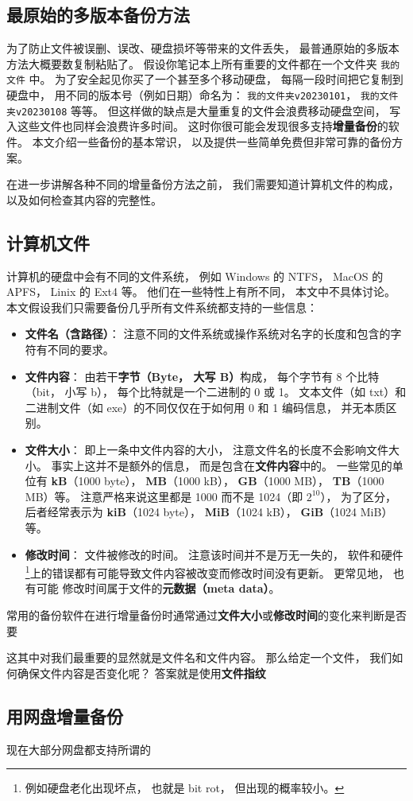 
\subsection{最原始的多版本备份方法}
为了防止文件被误删、误改、硬盘损坏等带来的文件丢失， 最普通原始的多版本方法大概要数复制粘贴了。 假设你笔记本上所有重要的文件都在一个文件夹 \verb|我的文件| 中。 为了安全起见你买了一个甚至多个移动硬盘， 每隔一段时间把它复制到硬盘中， 用不同的版本号（例如日期）命名为： \verb|我的文件夹v20230101|， \verb|我的文件夹v20230108| 等等。 但这样做的缺点是大量重复的文件会浪费移动硬盘空间， 写入这些文件也同样会浪费许多时间。 这时你很可能会发现很多支持\textbf{增量备份}的软件。 本文介绍一些备份的基本常识， 以及提供一些简单免费但非常可靠的备份方案。

在进一步讲解各种不同的增量备份方法之前， 我们需要知道计算机文件的构成， 以及如何检查其内容的完整性。

\subsection{计算机文件}
计算机的硬盘中会有不同的文件系统， 例如 Windows 的 NTFS， MacOS 的 APFS， Linix 的 Ext4 等。 他们在一些特性上有所不同， 本文中不具体讨论。 本文假设我们只需要备份几乎所有文件系统都支持的一些信息：
\begin{itemize}
\item \textbf{文件名（含路径）}： 注意不同的文件系统或操作系统对名字的长度和包含的字符有不同的要求。
\item \textbf{文件内容}： 由若干\textbf{字节（Byte， 大写 B）}构成， 每个字节有 8 个比特（bit， 小写 b）， 每个比特就是一个二进制的 0 或 1。 文本文件（如 txt）和二进制文件（如 exe）的不同仅仅在于如何用 0 和 1 编码信息， 并无本质区别。
\item \textbf{文件大小}： 即上一条中文件内容的大小， 注意文件名的长度不会影响文件大小。 事实上这并不是额外的信息， 而是包含在\textbf{文件内容}中的。 一些常见的单位有 \textbf{kB}（1000 byte）， \textbf{MB}（1000 kB）， \textbf{GB}（1000 MB）， \textbf{TB}（1000 MB）等。 注意严格来说这里都是 1000 而不是 1024（即 $2^{10}$）， 为了区分， 后者经常表示为 \textbf{kiB}（1024 byte）， \textbf{MiB}（1024 kB）， \textbf{GiB}（1024 MiB）等。
\item \textbf{修改时间}： 文件被修改的时间。 注意该时间并不是万无一失的， 软件和硬件\footnote{例如硬盘老化出现坏点， 也就是 bit rot， 但出现的概率较小。}上的错误都有可能导致文件内容被改变而修改时间没有更新。 更常见地， 也有可能 修改时间属于文件的\textbf{元数据（meta data）}。
\end{itemize}
常用的备份软件在进行增量备份时通常通过\textbf{文件大小}或\textbf{修改时间}的变化来判断是否要

这其中对我们最重要的显然就是文件名和文件内容。 那么给定一个文件， 我们如何确保文件内容是否变化呢？ 答案就是使用\textbf{文件指纹}


\subsection{用网盘增量备份}
现在大部分网盘都支持所谓的

